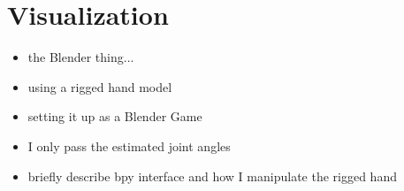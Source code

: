 \section{Visualization} \label{sec:visual}

\begin{itemize}
\item the Blender thing...
\item using a rigged hand model
\item setting it up as a Blender Game
\item I only pass the estimated joint angles
\item briefly describe bpy interface and how I manipulate the rigged hand
\end{itemize}




